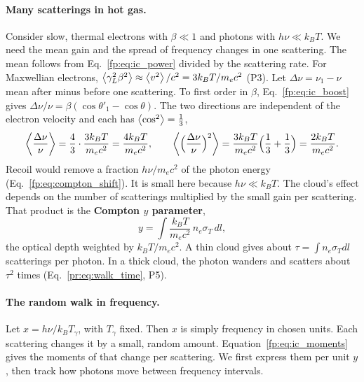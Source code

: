 \paragraph{Many scatterings in hot gas.} Consider slow, thermal electrons with $\beta\ll1$ and photons with $h\nu\ll k_BT$. We need the mean gain and the spread of frequency changes in one scattering. The mean follows from Eq.~\eqref{fp:eq:ic_power} divided by the scattering rate. For Maxwellian electrons, $\left\langle \gamma_L^2\beta^2\right\rangle\approx\left\langle v^2\right\rangle/c^2=3k_BT/m_ec^2$ (P3). Let $\Delta\nu=\nu_1-\nu$ mean after minus before one scattering. To first order in $\beta$, Eq.~\eqref{fp:eq:ic_boost} gives $\Delta\nu/\nu=\beta(\cos\theta'_1-\cos\theta)$. The two directions are independent of the electron velocity and each has $\left\langle \cos^2\right\rangle=\tfrac13$,
\begin{equation}
	\left\langle \frac{\Delta\nu}{\nu}\right\rangle=\frac43\cdot\frac{3k_BT}{m_ec^2}=\frac{4k_BT}{m_ec^2},\qquad
	\left\langle \Big(\frac{\Delta\nu}{\nu}\Big)^2\right\rangle=\frac{3k_BT}{m_ec^2}\Big(\frac13+\frac13\Big)=\frac{2k_BT}{m_ec^2} .
	\label{fp:eq:ic_moments}
\end{equation}
Recoil would remove a fraction $h\nu/m_ec^2$ of the photon energy (Eq.~\eqref{fp:eq:compton_shift}). It is small here because $h\nu\ll k_BT$. The cloud's effect depends on the number of scatterings multiplied by the small gain per scattering. That product is the \textbf{Compton $y$ parameter},
\begin{equation}
	\boxed{y=\int\frac{k_BT}{m_ec^2}\,n_e\sigma_T\,dl ,}
	\label{fp:eq:compton_y}
\end{equation}
the optical depth weighted by $k_BT/m_ec^2$. A thin cloud gives about $\tau=\int n_e\sigma_Tdl$ scatterings per photon. In a thick cloud, the photon wanders and scatters about $\tau^2$ times (Eq.~\eqref{pr:eq:walk_time}, P5).

\paragraph{The random walk in frequency.} Let $x=h\nu/k_BT_\gamma$, with $T_\gamma$ fixed. Then $x$ is simply frequency in chosen units. Each scattering changes it by a small, random amount. Equation~\eqref{fp:eq:ic_moments} gives the moments of that change per scattering. We first express them per unit $y$, then track how photons move between frequency intervals.

